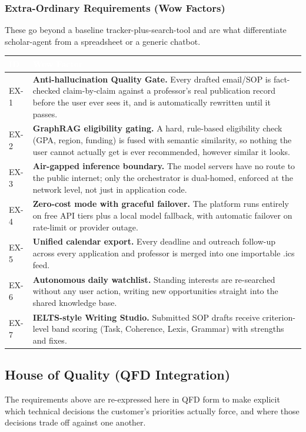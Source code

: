 \documentclass[11pt,a4paper]{article}
\begin{document}
\subsubsection{Extra-Ordinary Requirements (Wow Factors)}
These go beyond a baseline tracker-plus-search-tool and are what differentiate
scholar-agent from a spreadsheet or a generic chatbot.
\begin{tabularx}{\linewidth}{|C{1.35cm}|X|}
\hline
{}\textcolor{white}{\textbf{ID}} & \textcolor{white}{\textbf{Wow Factor}} \\
\hline
\mbox{EX-1} & \textbf{Anti-hallucination Quality Gate.} Every drafted email/SOP is fact-checked claim-by-claim against a professor's real publication record before the user ever sees it, and is automatically rewritten until it passes. \\
\mbox{EX-2} & \textbf{GraphRAG eligibility gating.} A hard, rule-based eligibility check (GPA, region, funding) is fused with semantic similarity, so nothing the user cannot actually get is ever recommended, however similar it looks. \\
\mbox{EX-3} & \textbf{Air-gapped inference boundary.} The model servers have no route to the public internet; only the orchestrator is dual-homed, enforced at the network level, not just in application code. \\
\mbox{EX-4} & \textbf{Zero-cost mode with graceful failover.} The platform runs entirely on free API tiers plus a local model fallback, with automatic failover on rate-limit or provider outage. \\
\mbox{EX-5} & \textbf{Unified calendar export.} Every deadline and outreach follow-up across every application and professor is merged into one importable .ics feed. \\
\mbox{EX-6} & \textbf{Autonomous daily watchlist.} Standing interests are re-searched without any user action, writing new opportunities straight into the shared knowledge base. \\
\mbox{EX-7} & \textbf{IELTS-style Writing Studio.} Submitted SOP drafts receive criterion-level band scoring (Task, Coherence, Lexis, Grammar) with strengths and fixes. \\
\hline
\end{tabularx}

\subsection{House of Quality (QFD Integration)}
The requirements above are re-expressed here in QFD form to make explicit which
technical decisions the customer's priorities actually force, and where those
decisions trade off against one another.
\end{document}
